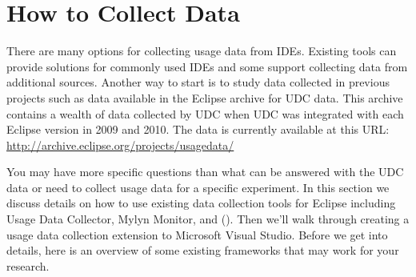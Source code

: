 \section{How to Collect Data}
\label{SecHowToCollectData}

There are many options for collecting usage data from IDEs.   Existing tools can provide solutions for commonly used IDEs and some support collecting data from additional sources.   Another way to start is to study data collected in previous projects such as data available in the Eclipse archive for UDC data.  This archive contains a wealth of data collected by UDC when UDC was integrated with each Eclipse version in 2009 and 2010.  The data is currently available at this URL:
\url{http://archive.eclipse.org/projects/usagedata/}

You may have more specific questions than what can be answered with the UDC data or need to collect usage data for a specific experiment.  In this section we discuss details on how to use existing data collection tools for Eclipse including Usage Data Collector, Mylyn Monitor, and \CodingSpectator{} ().  Then we'll walk through creating a usage data collection extension to Microsoft Visual Studio.  Before we get into details, here is an overview of some existing frameworks that may work for your research.

